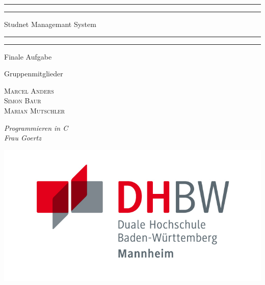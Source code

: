 \documentclass[a4paper, 11pt, oneside]{book} %
\begin{document}
 

\begin{titlepage} 
	\centering 
	\scshape 
	\vspace*{\baselineskip} 
	
	\rule{\textwidth}{1.6pt}\vspace*{-\baselineskip}\vspace*{2pt} 
	\rule{\textwidth}{0.4pt}
	
	\vspace{0.75\baselineskip} 
	
	{\LARGE Studnet Managemant System} %
	
	\vspace{0.75\baselineskip} 
	
	\rule{\textwidth}{0.4pt}\vspace*{-\baselineskip}\vspace{3.2pt} 
	\rule{\textwidth}{1.6pt} 
	
	\vspace{2\baselineskip} 
	
	
	Finale Aufgabe %
	
	\vspace*{3\baselineskip}
	
	
	Gruppenmitglieder
	
	\vspace{0.5\baselineskip} 
	
	{\scshape\Large Marcel Anders \\ Simon Baur \\ Marian Mutschler}
	
	\vspace{0.8\baselineskip}
	
	\textit{Programmieren in C \\ Frau Goertz \\} 
	
	\vfill %
	
	
    \includegraphics{assets/DHBW_MA_Logo.jpg}
	

\end{titlepage}
\end{document}
